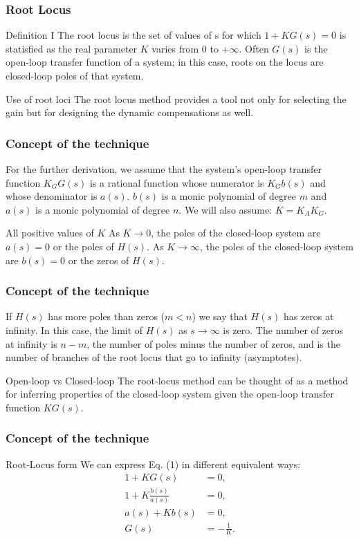\begin{frame}
\frametitle{Root Locus}
	\begin{block}{Definition I}
		The root locus is the set of values of s for which $1 + KG(s) = 0$ is statisfied as the real parameter $K$ varies from $0$ to $+\infty$. Often $G(s)$ is the open-loop transfer function of a system; in this case, roots on the locus are closed-loop poles of that system.
	\end{block}
	\begin{block}{Use of root loci}
		The root locus method provides a tool not only for selecting the gain but for designing the dynamic compensations as well.
	\end{block}
	
\end{frame}

\begin{frame}
\frametitle{Concept of the technique}
	For the further derivation, we assume that the system's open-loop transfer function $K_GG(s)$ is a rational function whose numerator is $K_Gb(s)$ and whose denominator is $a(s)$. $b(s)$ is a monic polynomial of degree $m$ and $a(s)$ is a monic polynomial of degree $n$. We will also assume: $K = K_AK_G$.
	\begin{block}{All positive values of $K$}
		As $K \rightarrow 0$, the poles of the closed-loop system are $a(s) = 0$ or the poles of $H(s)$. As $K \rightarrow \infty$, the poles of the closed-loop system are $b(s) = 0$ or the zeros of $H(s)$.
	\end{block}
\end{frame}

\begin{frame}
\frametitle{Concept of the technique}
	If $H(s)$ has more poles than zeros ($m < n$) we say that $H(s)$ has zeros at infinity. In this case, the limit of $H(s)$ as $s \rightarrow \infty$ is zero. The number of zeros at infinity is $n-m$, the number of poles minus the number of zeros, and is the number of branches of the root locus that go to infinity (asymptotes).
	
	\begin{alertblock}{Open-loop vs Closed-loop}
		The root-locus method can be thought of as a method for inferring properties of the closed-loop system given the open-loop transfer function $KG(s)$.
	\end{alertblock}
\end{frame}

\begin{frame}
\frametitle{Concept of the technique}
\begin{block}{Root-Locus form}
	We can express Eq. (1) in different equivalent ways:
	\vspace{-1em}
	\begin{align*}
		1 + KG(s) &= 0,\\
		1 + K\frac{b(s)}{a(s)} &= 0,\\
		a(s) + Kb(s) &=0,\\
		G(s) & = -\frac{1}{K}.
	\end{align*}
\end{block}
\end{frame}

